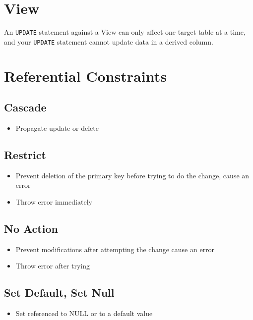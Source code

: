 \documentclass{article}
\begin{document}
\section{View}

An \texttt{UPDATE} statement against a View can only affect one target table at
a time, and your \texttt{UPDATE} statement cannot update data in a derived
column.

\section{Referential Constraints}

\subsection{Cascade}

\begin{itemize}
    \item Propagate update or delete
\end{itemize}

\subsection{Restrict}

\begin{itemize}
    \item Prevent deletion of the primary key before trying to do the change, cause an
          error
    \item Throw error immediately
\end{itemize}

\subsection{No Action}

\begin{itemize}
    \item Prevent modifications after attempting the change cause an error
    \item Throw error after trying
\end{itemize}

\subsection{Set Default, Set Null}

\begin{itemize}
    \item Set referenced to NULL or to a default value
\end{itemize}
\end{document}
